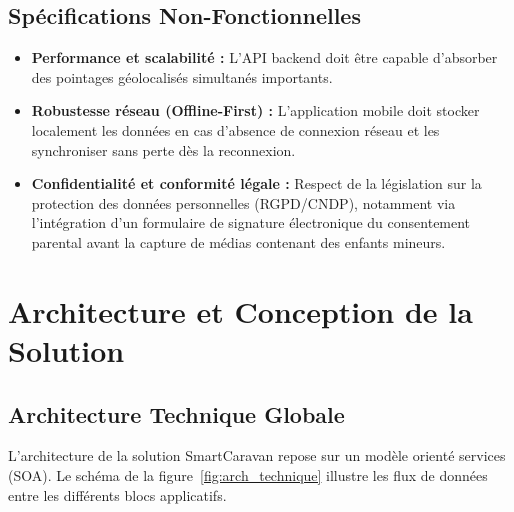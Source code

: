 \documentclass[12pt,a4paper]{report}
\begin{document}
\section{Spécifications Non-Fonctionnelles}
\begin{itemize}
    \item \textbf{Performance et scalabilité :} L'API backend doit être capable d'absorber des pointages géolocalisés simultanés importants.
    \item \textbf{Robustesse réseau (Offline-First) :} L'application mobile doit stocker localement les données en cas d'absence de connexion réseau et les synchroniser sans perte dès la reconnexion.
    \item \textbf{Confidentialité et conformité légale :} Respect de la législation sur la protection des données personnelles (RGPD/CNDP), notamment via l'intégration d'un formulaire de signature électronique du consentement parental avant la capture de médias contenant des enfants mineurs.
\end{itemize}

\chapter{Architecture et Conception de la Solution}

\section{Architecture Technique Globale}
L'architecture de la solution SmartCaravan repose sur un modèle orienté services (SOA). Le schéma de la figure~\ref{fig:arch_technique} illustre les flux de données entre les différents blocs applicatifs.
\end{document}
